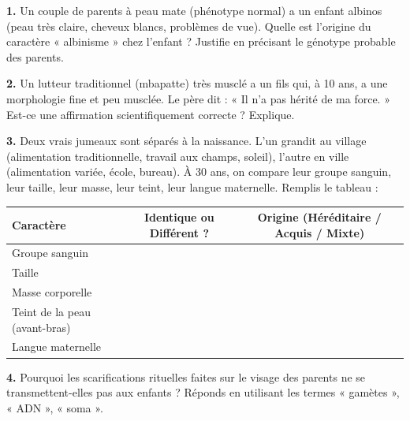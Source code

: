 \documentclass[11pt]{article}
\begin{document}
\begin{exercice}
\textbf{1.} Un couple de parents à peau mate (phénotype normal) a un enfant albinos (peau très claire, cheveux blancs, problèmes de vue). Quelle est l'origine du caractère « albinisme » chez l'enfant ? Justifie en précisant le génotype probable des parents.
\par\textbf{2.} Un lutteur traditionnel (mbapatte) très musclé a un fils qui, à 10 ans, a une morphologie fine et peu musclée. Le père dit : « Il n'a pas hérité de ma force. » Est-ce une affirmation scientifiquement correcte ? Explique.
\par\textbf{3.} Deux vrais jumeaux sont séparés à la naissance. L'un grandit au village (alimentation traditionnelle, travail aux champs, soleil), l'autre en ville (alimentation variée, école, bureau). À 30 ans, on compare leur groupe sanguin, leur taille, leur masse, leur teint, leur langue maternelle. Remplis le tableau :
\begin{center}
\begin{tabular}{|l|c|c|}\hline
\textbf{Caractère} & \textbf{Identique ou Différent ?} & \textbf{Origine (Héréditaire / Acquis / Mixte)} \\ \hline
Groupe sanguin & & \\ \hline
Taille & & \\ \hline
Masse corporelle & & \\ \hline
Teint de la peau (avant-bras) & & \\ \hline
Langue maternelle & & \\ \hline
\end{tabular}
\end{center}
\par\textbf{4.} Pourquoi les scarifications rituelles faites sur le visage des parents ne se transmettent-elles pas aux enfants ? Réponds en utilisant les termes « gamètes », « ADN », « soma ».
\end{exercice}
\end{document}
